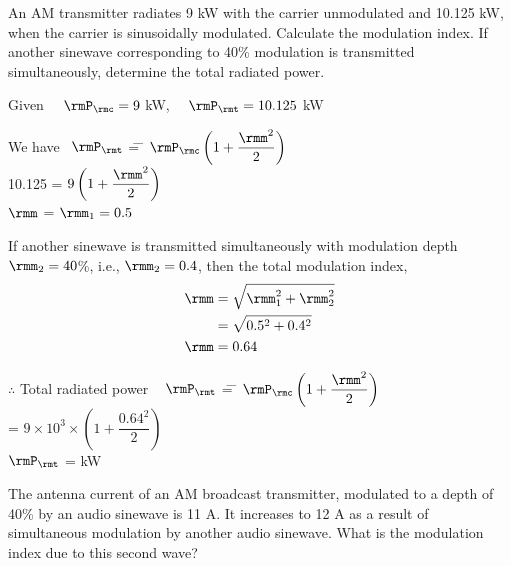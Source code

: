 \begin{problem}\label{prob8.15}
An AM transmitter radiates 9 kW with the carrier unmodulated and
10.125 kW, when the carrier is sinusoidally modulated. Calculate the
modulation index. If another sinewave corresponding to 40\% modulation
is transmitted simultaneously, determine the total radiated power.
\end{problem}

\begin{solution}
Given ~~$\rmP_\rmc = 9 $ kW, ~~$\rmP_\rmt = 10.125$ kW
\begin{tabbing}
We have ~$\rmP_\rmt$ \= = \= $\rmP_\rmc \left(1+\dfrac{\rmm^2}{2} \right)$\\[4pt]
\hspace{0.6cm} 10.125 \> = \> $9 \left(1+\dfrac{\rmm^2}{2} \right)$\\[4pt]
\hspace{1.4cm} $\rmm$ \> = \> $\rmm_1 = 0.5$
\end{tabbing}

If another sinewave is transmitted simultaneously with modulation
depth $\rmm_2 = 40$\%, i.e., $\rmm_2 = 0.4$, then the total modulation
index,
\begin{align*}
\rmm & = \sqrt{\rmm^2_1 + \rmm^2_2}\\
& = \sqrt{0.5^2 +0.4^2}\\
\rmm & = 0.64
\end{align*}
\begin{tabbing}
$\therefore$ Total radiated power ~ $\rmP_\rmt$ \= = \=
$\rmP_\rmc \left(1+\dfrac{\rmm^2}{2} \right) $\\[4pt]
\> = \> $9 \times 10^3 \times \left(1+\dfrac{0.64^2}{2} \right)$\\
\hspace{3.7cm} $\rmP_\rmt$ \> =  kW
\end{tabbing}
\end{solution}

\begin{problem}\label{prob8.16}
The antenna current of an AM broadcast transmitter, modulated to a
depth of 40\% by an audio sinewave is 11 A. It increases to 12 A as a
result of simultaneous modulation by another audio sinewave. What is
the modulation index due to this second wave?
\end{problem}

